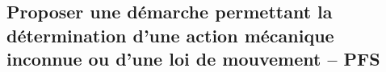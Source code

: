 \subsection{Proposer une démarche permettant la détermination d’une action mécanique inconnue ou d'une loi de mouvement -- PFS}
\renewcommand{\repExo}{../../ExercicesCompetences/C1_ProposerDemarche/C1_05_ProposerDemarcheActionMecaLoiMvt_PFS}

\renewcommand{\td}{01_T}
\graphicspath{{\repStyle/png/}{\repExo/\td/images/}}


\renewcommand{\td}{02_R}
\graphicspath{{\repStyle/png/}{\repExo/\td/images/}}


\renewcommand{\td}{03_TT}
\graphicspath{{\repStyle/png/}{\repExo/\td/images/}}


\renewcommand{\td}{04_RR}
\graphicspath{{\repStyle/png/}{\repExo/\td/images/}}


\renewcommand{\td}{05_RT}
\graphicspath{{\repStyle/png/}{\repExo/\td/images/}}


\renewcommand{\td}{06_TR}
\graphicspath{{\repStyle/png/}{\repExo/\td/images/}}


\renewcommand{\td}{07_RR3D}
\graphicspath{{\repStyle/png/}{\repExo/\td/images/}}


\renewcommand{\td}{08_RR3D}
\graphicspath{{\repStyle/png/}{\repExo/\td/images/}}


\renewcommand{\td}{55_Suspension}
\graphicspath{{\repStyle/png/}{\repExo/\td/images/}}


\renewcommand{\td}{57_PeseCamion}
\graphicspath{{\repStyle/png/}{\repExo/\td/images/}}

